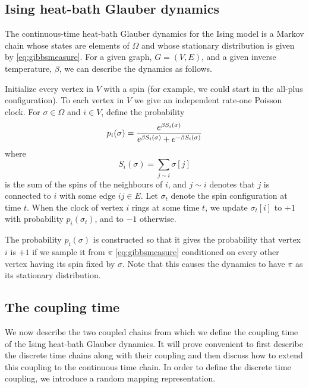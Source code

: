 	\subsection{Ising heat-bath Glauber dynamics}
	\label{sec:heat-bath glauber dynamics definition}
	The continuous-time heat-bath Glauber dynamics for the Ising model is a Markov chain whose states are elements of $\Omega$ and whose stationary distribution is given by \eqref{eq:gibbsmeasure}. For a given graph, $G = (V, E)$, and a given inverse temperature, $\beta$, we can describe the dynamics as follows. 

	Initialize every vertex in $V$ with a spin (for example, we could start in the all-plus configuration). To each vertex in $V$ we give an independent rate-one Poisson clock. For $\sigma \in \Omega$ and $i \in V$, define the probability 
	\begin{equation}
		p_i(\sigma) = \frac{e^{\beta S_i(\sigma)}}{e^{\beta S_i(\sigma)} + e^{-\beta S_i(\sigma)}}
		\label{eq:define p_i}
	\end{equation}
	where
	\begin{equation}
		S_i(\sigma) = \sum_{j \sim i} \sigma[j]
	\end{equation}
	is the sum of the spins of the neighbours of $i$, and $j \sim i$ denotes that $j$ is connected to $i$ with some edge $ij \in E$. Let $\sigma_t$ denote the spin configuration at time $t$. When the clock of vertex $i$ rings at some time $t$, we update $\sigma_t[i]$ to $+1$ with probability $p_i(\sigma_t)$, and to $-1$ otherwise.

	The probability $p_i(\sigma)$ is constructed so that it gives the probability that vertex $i$ is $+1$ if we sample it from $\pi$ \eqref{eq:gibbsmeasure} conditioned on every other vertex having its spin fixed by $\sigma$. Note that this causes the dynamics to have $\pi$ as its stationary distribution.

	\subsection{The coupling time}
	\label{sec:the coupling time}

	We now describe the two coupled chains from which we define the coupling time of the Ising heat-bath Glauber dynamics. It will prove convenient to first describe the discrete time chains along with their coupling and then discuss how to extend this coupling to the continuous time chain.	In order to define the discrete time coupling, we introduce a random mapping representation.

